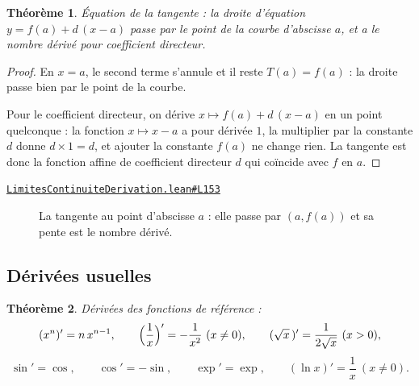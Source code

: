\documentclass[11pt,a4paper]{article}
\theoremstyle{definition}
\theoremstyle{plain}
\newtheorem{theoreme}{Théorème}
\newcommand{\source}[2]{\par\smallskip\noindent\hfill{\footnotesize\href{#1}{\texttt{#2}}}\par\smallskip}
\begin{document}
\begin{theoreme}
Équation de la tangente : la droite d'équation $y = f(a) + d\,(x - a)$ passe par le point
de la courbe d'abscisse $a$, et a le nombre dérivé pour coefficient directeur.
\end{theoreme}

\begin{proof}
En $x = a$, le second terme s'annule et il reste $T(a) = f(a)$ : la droite passe bien par
le point de la courbe.

Pour le coefficient directeur, on dérive $x \mapsto f(a) + d\,(x - a)$ en un point
quelconque : la fonction $x \mapsto x - a$ a pour dérivée $1$, la multiplier par la
constante $d$ donne $d \times 1 = d$, et ajouter la constante $f(a)$ ne change rien. La
tangente est donc la fonction affine de coefficient directeur $d$ qui coïncide avec $f$ en
$a$.
\end{proof}
\source{https://github.com/Commutator-IO/learn-lean/blob/main/courses/02-lycee/04-limites-continuite-derivation/LimitesContinuiteDerivation.lean\#L153}{LimitesContinuiteDerivation.lean\#L153}

\begin{figure}[h]
\centering

\caption{La tangente au point d'abscisse $a$ : elle passe par $(a, f(a))$ et sa pente est le nombre dérivé.}
\end{figure}

\subsection{Dérivées usuelles}

\begin{theoreme}
Dérivées des fonctions de référence :
\[ (x^n)' = n\,x^{n-1}, \qquad
   \Bigl(\frac{1}{x}\Bigr)' = -\frac{1}{x^{2}} \ (x \ne 0), \qquad
   (\sqrt{x}\,)' = \frac{1}{2\sqrt{x}} \ (x > 0), \]
\[ \sin' = \cos, \qquad \cos' = -\sin, \qquad \exp' = \exp, \qquad
   (\ln x)' = \frac{1}{x} \ (x \ne 0). \]
\end{theoreme}
\end{document}
